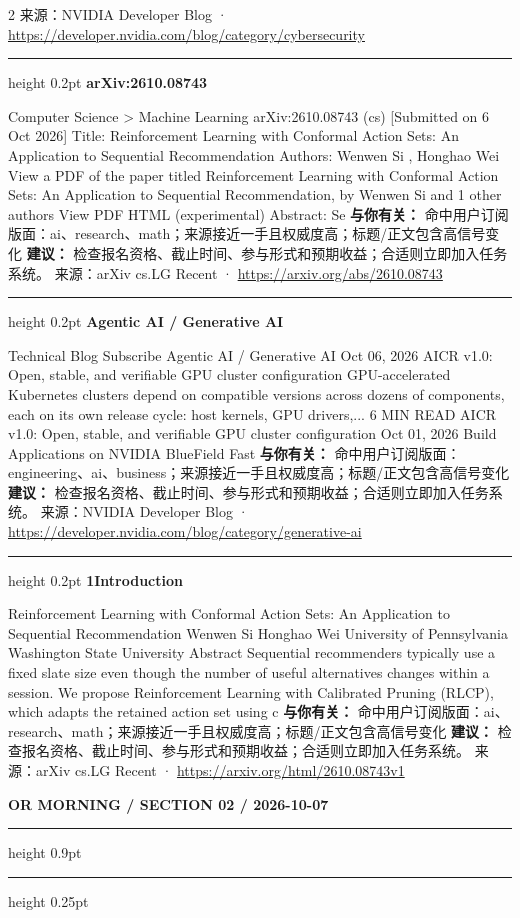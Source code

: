 \documentclass[10.5pt]{ctexart}
\begin{document}
\begin{multicols}{2}
{\footnotesize\color{ormuted} 来源：NVIDIA Developer Blog · \url{https://developer.nvidia.com/blog/category/cybersecurity}}
\vspace{2mm}
\hrule height 0.2pt
\vspace{2mm}
{\large\bfseries arXiv:2610.08743}\par
Computer Science > Machine Learning arXiv:2610.08743 (cs) [Submitted on 6 Oct 2026] Title: Reinforcement Learning with Conformal Action Sets: An Application to Sequential Recommendation Authors: Wenwen Si , Honghao Wei View a PDF of the paper titled Reinforcement Learning with Conformal Action Sets: An Application to Sequential Recommendation, by Wenwen Si and 1 other authors View PDF HTML (experimental) Abstract: Se
\textbf{与你有关：} 命中用户订阅版面：ai、research、math；来源接近一手且权威度高；标题/正文包含高信号变化
\textbf{建议：} 检查报名资格、截止时间、参与形式和预期收益；合适则立即加入任务系统。
{\footnotesize\color{ormuted} 来源：arXiv cs.LG Recent · \url{https://arxiv.org/abs/2610.08743}}
\vspace{2mm}
\hrule height 0.2pt
\vspace{2mm}
{\large\bfseries Agentic AI / Generative AI}\par
Technical Blog Subscribe Agentic AI / Generative AI Oct 06, 2026 AICR v1.0: Open, stable, and verifiable GPU cluster configuration GPU-accelerated Kubernetes clusters depend on compatible versions across dozens of components, each on its own release cycle: host kernels, GPU drivers,... 6 MIN READ AICR v1.0: Open, stable, and verifiable GPU cluster configuration Oct 01, 2026 Build Applications on NVIDIA BlueField Fast
\textbf{与你有关：} 命中用户订阅版面：engineering、ai、business；来源接近一手且权威度高；标题/正文包含高信号变化
\textbf{建议：} 检查报名资格、截止时间、参与形式和预期收益；合适则立即加入任务系统。
{\footnotesize\color{ormuted} 来源：NVIDIA Developer Blog · \url{https://developer.nvidia.com/blog/category/generative-ai}}
\vspace{2mm}
\hrule height 0.2pt
\vspace{2mm}
{\large\bfseries 1Introduction}\par
Reinforcement Learning with Conformal Action Sets: An Application to Sequential Recommendation Wenwen Si Honghao Wei University of Pennsylvania Washington State University Abstract Sequential recommenders typically use a fixed slate size even though the number of useful alternatives changes within a session. We propose Reinforcement Learning with Calibrated Pruning (RLCP), which adapts the retained action set using c
\textbf{与你有关：} 命中用户订阅版面：ai、research、math；来源接近一手且权威度高；标题/正文包含高信号变化
\textbf{建议：} 检查报名资格、截止时间、参与形式和预期收益；合适则立即加入任务系统。
{\footnotesize\color{ormuted} 来源：arXiv cs.LG Recent · \url{https://arxiv.org/html/2610.08743v1}}
\end{multicols}
\newpage
{\small\bfseries OR MORNING / SECTION 02 / 2026-10-07}
\vspace{2mm}
\hrule height 0.9pt
\vspace{1.5mm}
\hrule height 0.25pt
\vspace{4mm}
\end{document}

